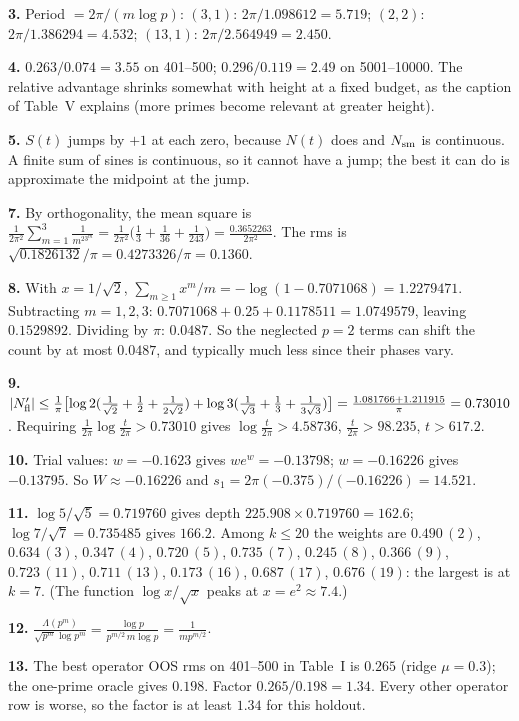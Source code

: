 \textbf{3.} Period $=2\pi/(m\log p)$: $(3,1)$: $2\pi/1.098612=5.719$; $(2,2)$: $2\pi/1.386294=4.532$; $(13,1)$: $2\pi/2.564949=2.450$.

\textbf{4.} $0.263/0.074=3.55$ on 401--500; $0.296/0.119=2.49$ on 5001--10000. The relative advantage shrinks somewhat with height at a fixed budget, as the caption of Table~V explains (more primes become relevant at greater height).

\textbf{5.} $S(t)$ jumps by $+1$ at each zero, because $N(t)$ does and $N_{\mathrm{sm}}$ is continuous. A finite sum of sines is continuous, so it cannot have a jump; the best it can do is approximate the midpoint at the jump.

\textbf{7.} By orthogonality, the mean square is $\frac{1}{2\pi^2}\sum_{m=1}^3\frac{1}{m^23^m}=\frac{1}{2\pi^2}\bigl(\frac13+\frac1{36}+\frac1{243}\bigr)=\frac{0.3652263}{2\pi^2}$. The rms is $\sqrt{0.1826132}/\pi=0.4273326/\pi=0.1360$.

\textbf{8.} With $x=1/\sqrt2$, $\sum_{m\ge1}x^m/m=-\log(1-0.7071068)=1.2279471$. Subtracting $m=1,2,3$: $0.7071068+0.25+0.1178511=1.0749579$, leaving $0.1529892$. Dividing by $\pi$: $0.0487$. So the neglected $p=2$ terms can shift the count by at most $0.0487$, and typically much less since their phases vary.

\textbf{9.} $\left\lvert N_{\mathrm{fl}}'\right\rvert\le\frac1\pi\bigl[\log2(\frac1{\sqrt2}+\frac12+\frac1{2\sqrt2})+\log3(\frac{1}{\sqrt3}+\frac13+\frac1{3\sqrt3})\bigr]=\frac{1.081766+1.211915}{\pi}=0.73010$. Requiring $\frac1{2\pi}\log\frac{t}{2\pi}>0.73010$ gives $\log\frac t{2\pi}>4.58736$, $\frac{t}{2\pi}>98.235$, $t>617.2$.

\textbf{10.} Trial values: $w=-0.1623$ gives $we^w=-0.13798$; $w=-0.16226$ gives $-0.13795$. So $W\approx-0.16226$ and $s_1=2\pi(-0.375)/(-0.16226)=14.521$.

\textbf{11.} $\log5/\sqrt5=0.719760$ gives depth $225.908\times0.719760=162.6$; $\log7/\sqrt7=0.735485$ gives $166.2$. Among $k\le20$ the weights are $0.490\,(2)$, $0.634\,(3)$, $0.347\,(4)$, $0.720\,(5)$, $0.735\,(7)$, $0.245\,(8)$, $0.366\,(9)$, $0.723\,(11)$, $0.711\,(13)$, $0.173\,(16)$, $0.687\,(17)$, $0.676\,(19)$: the largest is at $k=7$. (The function $\log x/\sqrt x$ peaks at $x=e^2\approx7.4$.)

\textbf{12.} $\frac{\Lambda(p^m)}{\sqrt{p^m}\log p^m}=\frac{\log p}{p^{m/2}\,m\log p}=\frac1{mp^{m/2}}$.

\textbf{13.} The best operator OOS rms on 401--500 in Table~I is $0.265$ (ridge $\mu=0.3$); the one-prime oracle gives $0.198$. Factor $0.265/0.198=1.34$. Every other operator row is worse, so the factor is at least $1.34$ for this holdout.

